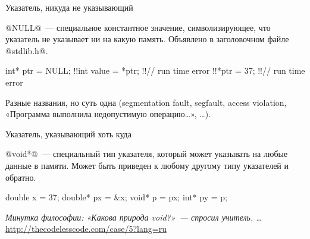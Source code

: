 \newcommand{\memlabel}[3]{
  \path (#1,\memtop) -- (#2,\memtop)
    node [midway,yshift=3mm,text height=1.5ex] {\ttfamily #3};
}

\newcommand{\memblockwithaddr}[5]{
  \memblock{#1}{#2}{#3}
  \memaddr{#1}{#4}
  \memaddr{#2-1}{#5}
}

\newcommand{\memblockwithaddrandlabel}[6]{
  \memblockwithaddr{#1}{#2}{#3}{#4}{#5}
  \memlabel{#1}{#2}{#6}
}

\newcommand{\memblockwithoneaddr}[4]{
  \memblock{#1}{#2}{#3}
  \memaddr{#1}{#4}
}

\newcommand{\memblockwithoneaddrandlabel}[5]{
  \memblockwithoneaddr{#1}{#2}{#3}{#4}
  \memlabel{#1}{#2}{#5}
}


\begin{frame}[fragile]{Указатель, никуда не указывающий}

  @NULL@~--- специальное константное значение, символизирующее, что указатель
  не указывает ни на какую память.
  Объявлено в заголовочном файле @stdlib.h@.

  \begin{clisting}[escapechar=\!]
    int* ptr = NULL;
    !!int value = *ptr; !!// run time error
    !!*ptr = 37; !!// run time error
  \end{clisting}

  Разные названия, но суть одна (segmentation fault, segfault, access
  violation, «Программа выполнила недопустимую операцию…», …).

\end{frame}

\begin{frame}[fragile]{Указатель, указывающий хоть куда}

  @void*@~--- специальный тип указателя, который может указывать на любые
  данные в памяти.
  Может быть приведен к любому другому типу указателей и обратно.

  \begin{clisting}[escapechar=\!]
    double x = 37;
    double* px = &x;
    void* p = px;
    int* py = p;
  \end{clisting}

  \pause

  \vspace{1em}
  \emph{Минутка философии: «Какова природа void?»~--- спросил учитель, …}
  \url{http://thecodelesscode.com/case/5?lang=ru}

\end{frame}


